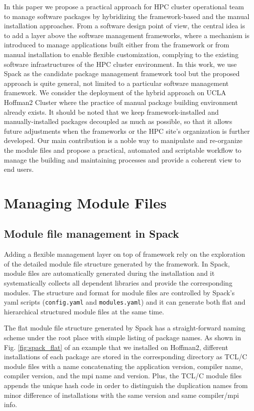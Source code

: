 \documentclass[conference]{IEEEtran}
\begin{document}
In this paper we propose a practical approach for HPC cluster operational team to manage software packages by hybridizing the framework-based and the manual installation approaches. 
From a software design point of view, the central idea is to add a layer above the software management frameworks, where a mechanism is introduced to manage applications built either from the framework or from manual installation to enable flexible customization, complying to the existing software infrastructures of the HPC cluster environment.
In this work, we use Spack as the candidate package management framework tool but the proposed approach is quite general, not limited to a particular software management framework. We consider the deployment of the hybrid approach on UCLA Hoffman2 Cluster where the practice of manual package building environment already exists.
It should be noted that we keep framework-installed and manually-installed packages decoupled as much as possible, so that it allows future adjustments when the frameworks or the HPC site's organization is further developed. 
Our main contribution is a noble way to manipulate and re-organize the module files and propose a practical, automated and scriptable workflow to manage the building and maintaining processes and provide a coherent view to end users.


\section{Managing Module Files} \label{sec_modulefiles}

\subsection{Module file management in Spack}

Adding a flexible management layer on top of framework rely on the exploration of the detailed module file structure generated by the framework.
In Spack, module files are automatically generated during the installation and it systematically collects all dependent libraries and provide the corresponding modules. 
The structure and format for module files are controlled by Spack's yaml scripts (\verb|config.yaml| and \verb|modules.yaml|) and it can generate both flat and hierarchical structured module files at the same time. 

The flat module file structure generated by Spack has a straight-forward naming scheme under the root place with simple listing of package names. 
As shown in Fig. \ref{fig:spack_flat} of an example that we installed on Hoffman2, different installations of each package are stored in the corresponding directory as TCL/C module files with a name concatenating the application version, compiler name, compiler version, and the mpi name and version. Plus, the TCL/C module files appends the unique hash code in order to distinguish the duplication names from minor difference of installations with the same version and same compiler/mpi info.
\end{document}

